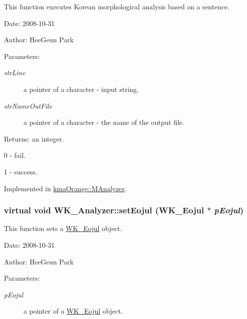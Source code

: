 This function executes Korean morphological analysis based on a sentence. 

\begin{Desc}
\item[Date:]2008-10-31 \end{Desc}
\begin{Desc}
\item[Author:]HeeGeun Park \end{Desc}
\begin{Desc}
\item[Parameters:]
\begin{description}
\item[{\em strLine}]a pointer of a character - input string. \item[{\em strNameOutFile}]a pointer of a character - the name of the output file. \end{description}
\end{Desc}
\begin{Desc}
\item[Returns:]an integer.\par
 0 - fail.\par
 1 - success. \end{Desc}


Implemented in \hyperlink{classkmaOrange_1_1MAnalyzer_c2286f99d2907066767a0b4c42d959a1}{kmaOrange::MAnalyzer}.\hypertarget{classWK__Analyzer_4c3350ac19c02b41670a3a96351fb684}{
\subsubsection[{setEojul}]{\setlength{\rightskip}{0pt plus 5cm}virtual void WK\_\-Analyzer::setEojul ({\bf WK\_\-Eojul} $\ast$ {\em pEojul})}}
\label{classWK__Analyzer_4c3350ac19c02b41670a3a96351fb684}


This function sets a \hyperlink{classWK__Eojul}{WK\_\-Eojul} object. 

\begin{Desc}
\item[Date:]2008-10-31 \end{Desc}
\begin{Desc}
\item[Author:]HeeGeun Park \end{Desc}
\begin{Desc}
\item[Parameters:]
\begin{description}
\item[{\em pEojul}]a pointer of a \hyperlink{classWK__Eojul}{WK\_\-Eojul} object. \end{description}
\end{Desc}


